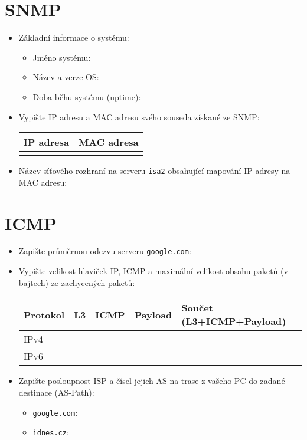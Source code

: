 \section{SNMP}
\begin{itemize}
    \item Základní informace o systému:
    \begin{itemize}
        \item Jméno systému:
         \vspace{1cm}
        \item Název a verze OS:
         \vspace{1cm}
        \item Doba běhu systému (uptime):
         \vspace{1cm}
    \end{itemize}
    \item Vypište IP adresu a MAC adresu svého souseda získané ze SNMP:
    
\begin{tabular}{|p{5cm}|p{5cm}|}
\hline
IP adresa  & MAC adresa   \\ \hline
      &     \\   \hline
\end{tabular}
    \item Název síťového rozhraní na serveru {\tt isa2} obsahující mapování IP adresy na MAC adresu:
     \vspace{1cm}
\end{itemize}

\section{ICMP}
\begin{itemize}
    \item Zapište průměrnou odezvu serveru \texttt{google.com}:
    \item Vypište velikost hlaviček IP, ICMP a maximální velikost obsahu paketů (v bajtech) ze zachycených paketů:
    
    \begin{tabular}{|p{2cm}|p{2cm}|p{2cm}|l|l|}  \hline
     Protokol  & L3  & ICMP  & Payload & Součet (L3+ICMP+Payload) \\ \hline
     IPv4      &     &       &         &   \\   \hline
     IPv6      &     &       &         &     \\  \hline
\end{tabular}
    
    \item Zapište posloupnost ISP a čísel jejich AS na trase z vašeho PC do zadané destinace (AS-Path):
        \begin{itemize}
            \item \texttt{google.com}:
            \vspace{3cm}
            \item \texttt{idnes.cz}:
            \vspace{3cm}
        \end{itemize}
\end{itemize}
